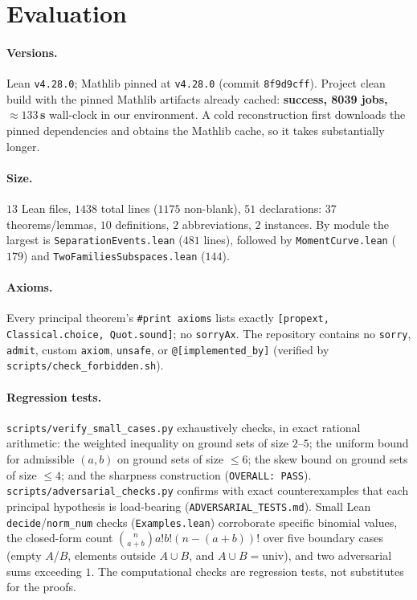 \documentclass[11pt]{article}
\newcommand{\bind}[2]{\binom{#1}{#2}}
\begin{document}
\section{Evaluation}\label{sec:eval}

\paragraph{Versions.} Lean \texttt{v4.28.0}; Mathlib pinned at \texttt{v4.28.0} (commit
\texttt{8f9d9cff}). Project clean build with the pinned Mathlib artifacts already cached:
\textbf{success, 8039 jobs, $\approx 133$\,s} wall-clock in our environment. A cold reconstruction first downloads the pinned dependencies and obtains the Mathlib cache, so it takes substantially longer.

\paragraph{Size.} $13$ Lean files, $1438$ total lines ($1175$ non-blank), $51$
declarations: $37$ theorems/lemmas, $10$ definitions, $2$ abbreviations, $2$ instances.
By module the largest is \texttt{SeparationEvents.lean} ($481$ lines), followed by
\texttt{MomentCurve.lean} ($179$) and \texttt{TwoFamiliesSubspaces.lean} ($144$).

\paragraph{Axioms.} Every principal theorem's \lstinline{#print axioms} lists exactly
\lstinline{[propext, Classical.choice, Quot.sound]}; no \lstinline{sorryAx}. The
repository contains no \lstinline{sorry}, \lstinline{admit}, custom \lstinline{axiom},
\lstinline{unsafe}, or \lstinline{@[implemented_by]} (verified by
\texttt{scripts/check\_forbidden.sh}).

\paragraph{Regression tests.} \texttt{scripts/verify\_small\_cases.py} exhaustively
checks, in exact rational arithmetic: the weighted inequality on ground sets of size
$2$--$5$; the uniform bound for admissible $(a,b)$ on ground sets of size $\le 6$; the
skew bound on ground sets of size $\le 4$; and the sharpness construction
(\texttt{OVERALL: PASS}). \texttt{scripts/adversarial\_checks.py} confirms with exact
counterexamples that each principal hypothesis is load-bearing
(\texttt{ADVERSARIAL\_TESTS.md}). Small Lean \lstinline{decide}/\lstinline{norm_num}
checks (\texttt{Examples.lean}) corroborate specific binomial values, the closed-form
count $\bind{n}{a+b}a!b!(n-(a{+}b))!$ over five boundary cases (empty $A$/$B$, elements
outside $A\cup B$, and $A\cup B=\mathrm{univ}$), and two adversarial sums exceeding $1$.
The computational checks are regression tests, not substitutes for the proofs.
\end{document}
